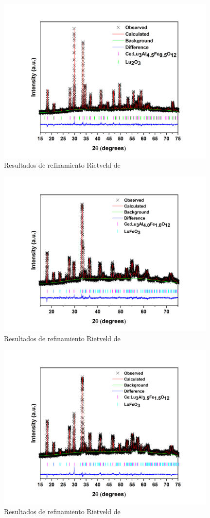 \begin{appendix}
	\begin{figure}[h]
		\centering%
		\includegraphics[width=11cm]{Anexos/x05.png}%
		\caption{Resultados de refinamiento Rietveld de
		} \label{fig:refi05}
	\end{figure}

	\begin{figure}[h]
		\centering%
		\includegraphics[width=11cm]{Anexos/x10.png}%
		\caption{Resultados de refinamiento Rietveld de
		}\label{fig:refi10}
	\end{figure}

	\begin{figure}[h]
		\centering%
		\includegraphics[width=11cm]{Anexos/x15.png}%
		\caption{Resultados de refinamiento Rietveld de
		}\label{fig:refi15}
	\end{figure}


\end{appendix}
